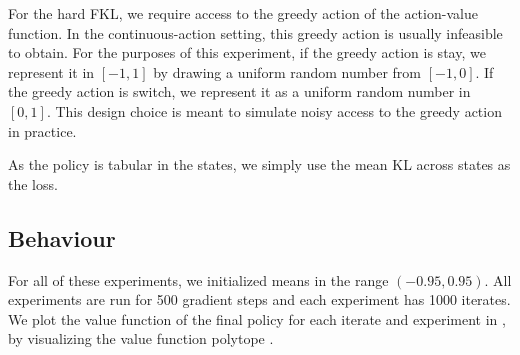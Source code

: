 \documentclass[\main/thesis.tex]{subfiles}
\begin{document}
For the hard FKL, we require access to the greedy action of the action-value function. In the continuous-action setting, this greedy action is usually infeasible to obtain. For the purposes of this experiment, if the greedy action is stay, we represent it in $[-1, 1]$ by drawing a uniform random number from $[-1, 0]$. If the greedy action is switch, we represent it as a uniform random number in $[0, 1]$. This design choice is meant to simulate noisy access to the greedy action in practice. 

As the policy is tabular in the states, we simply use the mean KL across states as the loss. 

\subsection{Behaviour}
For all of these experiments, we initialized means in the range $(-0.95, 0.95)$. All experiments are run for 500 gradient steps and each experiment has 1000 iterates. We plot the value function of the final policy for each iterate and experiment in , by visualizing the value function polytope \citep{dadashi2019value}. 


  
\end{document}
